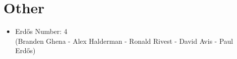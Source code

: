 \documentclass{article}
\begin{document}
\section*{Other}
\vspace{-6pt}
\begin{itemize}
  \item[] Erdős Number: 4\\(Branden Ghena - Alex Halderman - Ronald Rivest - David Avis - Paul Erdős)
\end{itemize}
\end{document}
